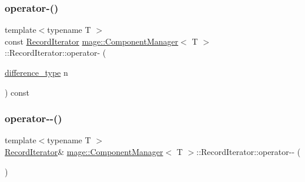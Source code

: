 \subsubsection{\texorpdfstring{operator-\/()}{operator-()}\hspace{0.1cm}{\footnotesize\ttfamily [2/2]}}
{\footnotesize\ttfamily template$<$typename T $>$ \\
const \mbox{\hyperlink{classmage_1_1_component_manager_1_1_record_iterator}{Record\+Iterator}} \mbox{\hyperlink{classmage_1_1_component_manager}{mage\+::\+Component\+Manager}}$<$ T $>$\+::Record\+Iterator\+::operator-\/ (\begin{DoxyParamCaption}\item[{\mbox{\hyperlink{classmage_1_1_component_manager_1_1_record_iterator_a3ca7b08fca57e3f69c5de58be46edd70}{difference\+\_\+type}}}]{n }\end{DoxyParamCaption}) const\hspace{0.3cm}{\ttfamily [noexcept]}}

\mbox{\label{classmage_1_1_component_manager_1_1_record_iterator_a62c8570d95de19efcbdc1339446000c9}} 
\subsubsection{\texorpdfstring{operator-\/-\/()}{operator--()}}
{\footnotesize\ttfamily template$<$typename T $>$ \\
\mbox{\hyperlink{classmage_1_1_component_manager_1_1_record_iterator}{Record\+Iterator}}\& \mbox{\hyperlink{classmage_1_1_component_manager}{mage\+::\+Component\+Manager}}$<$ T $>$\+::Record\+Iterator\+::operator-\/-\/ (\begin{DoxyParamCaption}{ }\end{DoxyParamCaption})\hspace{0.3cm}{\ttfamily [noexcept]}}

\mbox{\label{classmage_1_1_component_manager_1_1_record_iterator_a9eaca4e33e06e584138fc906aa780a3a}} 
